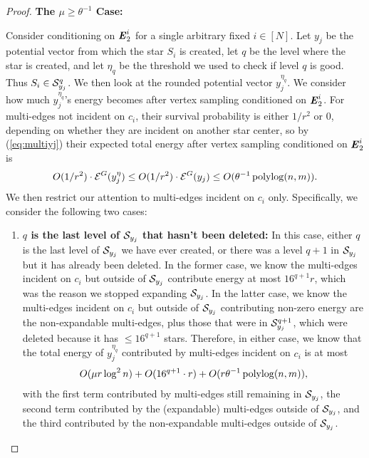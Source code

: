 \documentclass{article}
\begin{document}
\begin{proof}
\noindent \textbf{The $\mu \geq \theta^{-1}$ Case:}{
    Consider conditioning on $\boldsymbol{\mathit{E}}_2^i$ for a single arbitrary fixed $i\in[N]$.
    Let $y_j$ be the potential vector from which the star $S_i$ is created,
    let $q$ be the level where the star is created,
    and let $\eta_q$ be the threshold we used to check if level $q$ is good.
    Thus $S_i \in \mathcal{S}_{y_j}^{q}$.
    We then look at the rounded potential vector $y_j^{\eta_q}$.
    We consider how much $y_j^{\eta_q}$'s energy becomes after vertex sampling
    conditioned on $\boldsymbol{\mathit{E}}_2^i$.
    For multi-edges not incident on $c_i$, their survival probability is
    either $1/r^2$ or $0$, depending on
    whether they are incident on another star center, so by (\ref{eq:multiyj})
    their expected total energy after vertex sampling conditioned on $\boldsymbol{\mathit{E}}_2^i$ is
    $$O(1/r^2) \cdot \mathcal{E}^G(y_j^\eta)
    \leq O(1/r^2) \cdot \mathcal{E}^G(y_j) \leq O(\theta^{-1} \operatorname{polylog}(n,m)). $$
    We then restrict our attention to multi-edges incident on $c_i$ only.
    Specifically, we consider the following two cases:
    \begin{enumerate}
        \item \textbf{$q$ is the last level of $\mathcal{S}_{y_j}$ that hasn't been
        deleted: }
        In this case, either $q$ is the last level of $\mathcal{S}_{y_j}$ we have
        ever created, or there was a level $q+1$ in $\mathcal{S}_{y_j}$ but it has already been
        deleted.
        In the former case, we know the multi-edges incident on $c_i$
        but outside of $\mathcal{S}_{y_j}$
        contribute energy at most $16^{q+1} r$, which was the reason we stopped expanding
        $\mathcal{S}_{y_j}$. In the latter case,
        we know the multi-edges incident on $c_i$
        but outside of $\mathcal{S}_{y_j}$ contributing non-zero energy
        are the non-expandable multi-edges,
        plus those that were in $\mathcal{S}_{y_j}^{q+1}$, which were deleted because
        it has $\leq 16^{q+1}$ stars.
        Therefore,
        in either case, we know that the total energy of $y_j^{\eta_q}$ contributed
        by multi-edges incident on $c_i$ is at most
        \begin{align}\label{eq:contri1}
        O(\mu r \log^2 n) + O(16^{q+1} \cdot r) +
        O(r \theta^{-1} \operatorname{polylog}(n,m)),
        \end{align}
        with the first term contributed by multi-edges
        still remaining in $\mathcal{S}_{y_j}$, the second term contributed by
        the (expandable) multi-edges outside of $\mathcal{S}_{y_j}$, and the third contributed by
        the non-expandable multi-edges outside of $\mathcal{S}_{y_j}$.
        

\end{enumerate}}
\end{proof}
\end{document}
